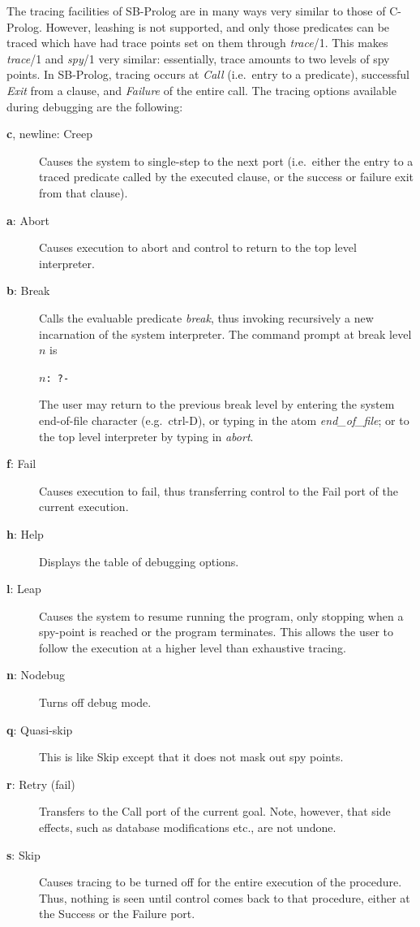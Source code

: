 The tracing facilities of SB-Prolog are in many ways very similar to those of
C-Prolog.
However, leashing is not supported, and only those predicates
can be traced which have had trace points
set on them through {\em trace}/1.
This makes {\em trace}/1 and {\em spy}/1 very similar:
essentially, trace amounts to two levels of spy points.
In SB-Prolog, tracing occurs at {\em Call} (i.e.\ entry to a predicate),
successful {\em Exit} from a clause, and {\em Failure} of the entire call.
The tracing options available during debugging are the following:
\begin{description}
\item[{\bf c}, {\sc newline}: Creep]
    Causes the system to single-step to the next port
    (i.e.\ either the entry to a traced predicate called by the executed clause,
    or the success or failure exit from that clause).
\item[{\bf a}: Abort]
    Causes execution to abort and control to return
    to the top level interpreter.
\item[{\bf b}: Break]
    Calls the evaluable predicate {\em break}, thus invoking recursively
    a new incarnation of the system interpreter.
    The command prompt at break level $n$ is
    \begin{center}
    {\tt $n$: \tt ?-}
    \end{center}
    The user may return to the previous break level by entering the system
    end-of-file character (e.g.\ ctrl-D), or
    typing in the atom {\em end\_\/of\_\/file};
    or to the top level interpreter by typing in {\em abort}.

\item[{\bf f}: Fail] Causes execution to fail,
    thus transferring control to the Fail port of the current execution.
\item[{\bf h}: Help] Displays the table of debugging options.
\item[{\bf l}: Leap] Causes the system to resume running the program,
    only stopping when a spy-point is reached or the program terminates.
    This allows the user to follow the execution at a higher level than
    exhaustive tracing.
\item[{\bf n}: Nodebug] Turns off debug mode.
\item[{\bf q}: Quasi-skip] This is like Skip
    except that it does not mask out spy points.
\item[{\bf r}: Retry (fail)] Transfers to the Call port of the current goal.
    Note, however, that side effects, such as database modifications etc.,
    are not undone.
\item[{\bf s}: Skip] Causes tracing to be turned off
    for the entire execution of the procedure.
    Thus, nothing is seen until control comes back to that procedure,
    either at the Success or the Failure port.
\end{description}

